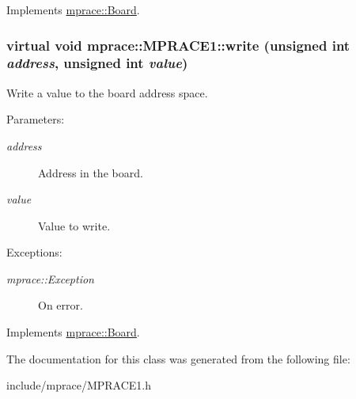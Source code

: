Implements \hyperlink{classmprace_1_1Board_a4}{mprace::Board}.\hypertarget{classmprace_1_1MPRACE1_a2}{
\subsubsection[write]{\setlength{\rightskip}{0pt plus 5cm}virtual void mprace::MPRACE1::write (unsigned int {\em address}, unsigned int {\em value})}}
\label{classmprace_1_1MPRACE1_a2}


Write a value to the board address space. 

\begin{Desc}
\item[Parameters:]
\begin{description}
\item[{\em address}]Address in the board. \item[{\em value}]Value to write. \end{description}
\end{Desc}
\begin{Desc}
\item[Exceptions:]
\begin{description}
\item[{\em mprace::Exception}]On error.\end{description}
\end{Desc}


Implements \hyperlink{classmprace_1_1Board_a3}{mprace::Board}.

The documentation for this class was generated from the following file:\begin{CompactItemize}
\item 
include/mprace/MPRACE1.h\end{CompactItemize}
